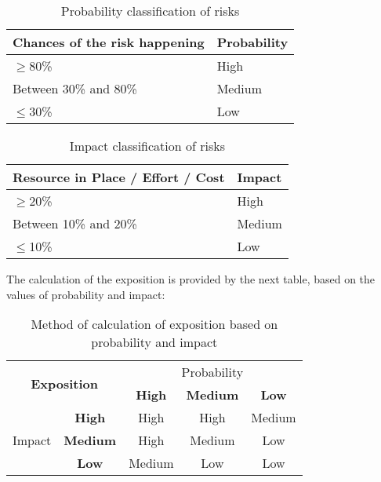 \begin{table}[H]
	\centering
	\begin{tabular}{|l|l|}
		\hline
		\rowcolor{gray!30}
		Chances of the risk happening & Probability \\ \hline
		$\geq$80\% & \cellcolor{red!60}High\\ \hline
		Between 30\% and 80\% & \cellcolor{yellow!40}Medium\\ \hline
		$\leq$30\% & \cellcolor{green!60}Low\\ \hline
	\end{tabular}
	\caption{Probability classification of risks}
\end{table}

\begin{table}[H]
	\centering
	\begin{tabular}{|l|l|}
		\hline
		\rowcolor{gray!30}
		Resource in Place / Effort / Cost & Impact \\ \hline
		$\geq$20\% & \cellcolor{red!60}High\\ \hline
		Between 10\% and 20\% & \cellcolor{yellow!40}Medium\\ \hline
		$\leq$10\% & \cellcolor{green!60}Low\\ \hline
	\end{tabular}
	\caption{Impact classification of risks}
\end{table}

\linej
The calculation of the exposition is provided by the next table, based on the values of probability and impact:
\begin{table}[H]
	\centering
	\begin{tabular}{|c|c|c|c|c|}
	\hline
		\multicolumn{2}{|c|}{\multirow{2}{*}{\large\textbf{Exposition}}} & \multicolumn{3}{c|}{Probability}\\
		\multicolumn{2}{|c|}{} & \cellcolor{gray!15}\textbf{High} & \cellcolor{gray!15}\textbf{Medium} & \cellcolor{gray!15}\textbf{Low}\\ \hline %
		\multirow{3}{*}{Impact} & \cellcolor{gray!15}\textbf{High} & \cellcolor{red!60}High & \cellcolor{red!60}High & \cellcolor{yellow!40}Medium\\
		& \cellcolor{gray!15}\textbf{Medium} & \cellcolor{red!60}High & \cellcolor{yellow!40}Medium & \cellcolor{green!60}Low\\
		& \cellcolor{gray!15}\textbf{Low} & \cellcolor{yellow!40}Medium & \cellcolor{green!60}Low & \cellcolor{green!60}Low\\ \hline
	\end{tabular}
	\caption{Method of calculation of exposition based on probability and impact}
\end{table}

